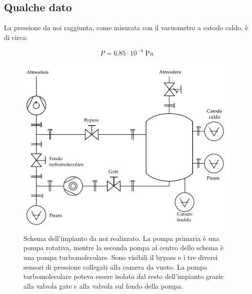 \subsection{Qualche dato}

La pressione da noi raggiunta, come misurata con il vacuometro a catodo caldo, è di circa:

\begin{equation}
    P = 6.85 \cdot 10^{-4} \; \si{\pascal}
\end{equation}

\begin{figure}[b!]
    \centering
   \includegraphics[width=16cm]{drawing.pdf}
   \caption{Schema dell'impianto da noi realizzato. La pompa primaria è una pompa rotativa, mentre la seconda pompa al centro dello schema
   è una pompa turbomolecolare. Sono visibili il bypass e i tre diversi sensori di pressione collegati alla camera da vuoto. La pompa
   turbomolecolare poteva essere isolata dal resto dell'impianto grazie alla valvola gate e alla valvola sul fondo della pompa.}
   \label{fig:schema}
\end{figure}

